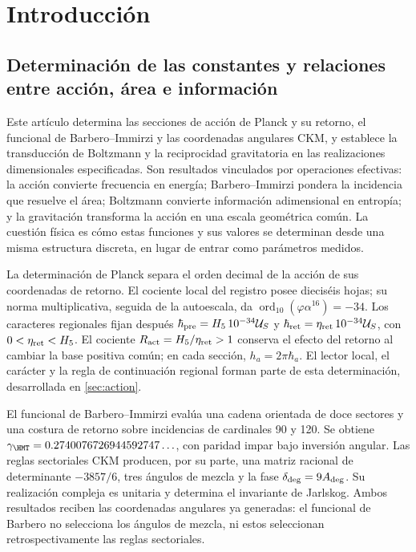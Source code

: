 \section{Introducción}

\subsection{Determinación de las constantes y relaciones entre acción, área e información}

Este artículo determina las secciones de acción de Planck y su retorno,
el funcional de Barbero--Immirzi y las coordenadas angulares CKM, y
establece la transducción de Boltzmann y la reciprocidad gravitatoria en
las realizaciones dimensionales especificadas. Son resultados vinculados
por operaciones efectivas: la acción convierte frecuencia en energía;
Barbero--Immirzi pondera la incidencia que resuelve el área; Boltzmann
convierte información adimensional en entropía; y la gravitación
transforma la acción en una escala geométrica común. La cuestión física
es cómo estas funciones y sus valores se determinan desde una misma
estructura discreta, en lugar de entrar como parámetros medidos.

La determinación de Planck separa el orden decimal de la acción de sus
coordenadas de retorno. El cociente local del registro posee dieciséis
hojas; su norma multiplicativa, seguida de la autoescala, da
\(\operatorname{ord}_{10}(\varphi\alpha^{16})=-34\).
Los caracteres regionales fijan después
\(\hbar_{\rm pre}=H_5\,10^{-34}\mathcal U_S\) y
\(\hbar_{\rm ret}=\eta_{\rm ret}\,10^{-34}\mathcal U_S\),
con \(0<\eta_{\rm ret}<H_5\). El cociente
\(R_{\rm act}=H_5/\eta_{\rm ret}>1\) conserva el efecto del
retorno al cambiar la base positiva común; en cada sección,
\(h_a=2\pi\hbar_a\). El lector local, el carácter y la regla de
continuación regional forman parte de esta determinación, desarrollada
en \ref{sec:action}.

El funcional de Barbero--Immirzi evalúa una cadena orientada de doce
sectores y una costura de retorno sobre incidencias de cardinales 90
y 120. Se obtiene
\(\gamma_{\HMT}=0.2740076726944592747\ldots\), con paridad impar
bajo inversión angular. Las reglas sectoriales CKM producen, por su
parte, una matriz racional de determinante \(-3857/6\), tres ángulos
de mezcla y la fase \(\delta_{\rm deg}=9A_{\rm deg}\).
Su realización compleja es unitaria y determina el invariante de
Jarlskog. Ambos resultados reciben las coordenadas angulares ya
generadas: el funcional de Barbero no selecciona los ángulos de mezcla,
ni estos seleccionan retrospectivamente las reglas sectoriales.

